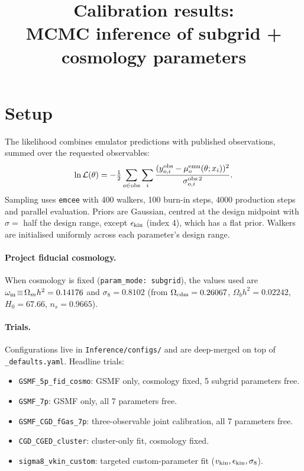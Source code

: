 \documentclass{article}
\title{Calibration results:\\
MCMC inference of subgrid + cosmology parameters}
\author{}
\date{}
\begin{document}
\maketitle

\section{Setup}

The likelihood combines emulator predictions with published
observations, summed over the requested observables:
\begin{equation}
\ln\mathcal{L}(\theta) = -\tfrac{1}{2}\sum_{o\in \mathrm{obs}}
\sum_{i} \frac{(y^{\rm obs}_{o,i} - \mu^{\rm emu}_o(\theta;x_i))^2}
              {\sigma^{\rm obs\,2}_{o,i}}.
\end{equation}
Sampling uses \texttt{emcee} with 400 walkers, 100 burn-in steps, 4000
production steps and parallel evaluation. Priors are Gaussian, centred
at the design midpoint with $\sigma=$ half the design range, except
$\epsilon_{\rm kin}$ (index 4), which has a flat prior. Walkers are
initialised uniformly across each parameter's design range.

\paragraph{Project fiducial cosmology.} When cosmology is fixed
(\texttt{param\_mode: subgrid}), the values used are
$\omega_{\rm m}\!\equiv\!\Omega_m h^2=0.14176$ and $\sigma_8=0.8102$
(from $\Omega_{\rm cdm}=0.26067$, $\Omega_b h^2=0.02242$, $H_0=67.66$,
$n_s=0.9665$).

\paragraph{Trials.} Configurations live in
\texttt{Inference/configs/} and are deep-merged on top of
\texttt{\_defaults.yaml}. Headline trials:
\begin{itemize}
  \item \texttt{GSMF\_5p\_fid\_cosmo}: GSMF only, cosmology fixed, 5
        subgrid parameters free.
  \item \texttt{GSMF\_7p}: GSMF only, all 7 parameters free.
  \item \texttt{GSMF\_CGD\_fGas\_7p}: three-observable joint
        calibration, all 7 parameters free.
  \item \texttt{CGD\_CGED\_cluster}: cluster-only fit, cosmology fixed.
  \item \texttt{sigma8\_vkin\_custom}: targeted custom-parameter fit
        ($v_{\rm kin}, \epsilon_{\rm kin}, \sigma_8$).
\end{itemize}
\end{document}
